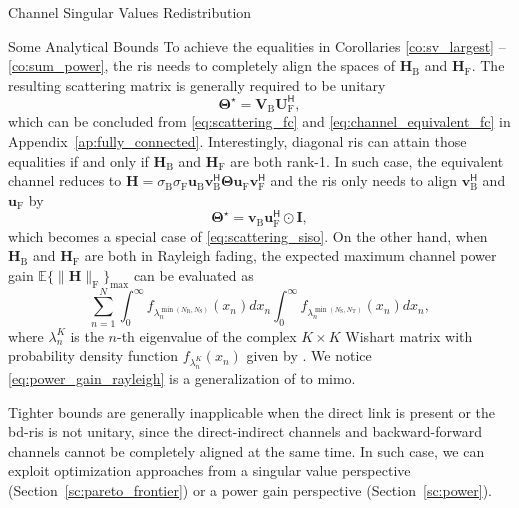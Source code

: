 \documentclass[journal]{IEEEtran}
\begin{document}
\begin{section}{Channel Singular Values Redistribution}
\begin{subsection}{Some Analytical Bounds}
		To achieve the equalities in Corollaries \eqref{co:sv_largest} -- \eqref{co:sum_power}, the \gls{ris} needs to completely align the spaces of $\mathbf{H}_\mathrm{B}$ and $\mathbf{H}_\mathrm{F}$.
		The resulting scattering matrix is generally required to be unitary
		\begin{equation}
			\mathbf{\Theta}^\star = \mathbf{V}_\mathrm{B} \mathbf{U}_\mathrm{F}^\mathsf{H},
			\label{eq:scattering_fc_optimal}
		\end{equation}
		which can be concluded from \eqref{eq:scattering_fc} and \eqref{eq:channel_equivalent_fc} in Appendix~\ref{ap:fully_connected}.
		Interestingly, diagonal \gls{ris} can attain those equalities if and only if $\mathbf{H}_\mathrm{B}$ and $\mathbf{H}_\mathrm{F}$ are both rank-1.
		In such case, the equivalent channel reduces to $\mathbf{H} = \sigma_\mathrm{B} \sigma_\mathrm{F} \mathbf{u}_\mathrm{B} \mathbf{v}_\mathrm{B}^\mathsf{H} \mathbf{\Theta} \mathbf{u}_\mathrm{F} \mathbf{v}_\mathrm{F}^\mathsf{H}$ and the \gls{ris} only needs to align $\mathbf{v}_\mathrm{B}^\mathsf{H}$ and $\mathbf{u}_\mathrm{F}$ by
		\begin{equation}
			\mathbf{\Theta}^\star = \mathbf{v}_\mathrm{B} \mathbf{u}_\mathrm{F}^\mathsf{H} \odot \mathbf{I},
		\end{equation}
		which becomes a special case of \eqref{eq:scattering_siso}.
		On the other hand, when $\mathbf{H}_\mathrm{B}$ and $\mathbf{H}_\mathrm{F}$ are both in Rayleigh fading, the expected maximum channel power gain $\mathbb{E}\bigl\{ \lVert \mathbf{H} \rVert _ \mathrm{F} \bigr\}_{\max}$ can be evaluated as
		\begin{equation}
			\sum_{n=1}^N \int_0^\infty f_{\lambda_n^{\min(N_\mathrm{R},N_\mathrm{S})}}(x_n) d x_n \int_0^\infty f_{\lambda_n^{\min(N_\mathrm{S},N_\mathrm{T})}}(x_n) d x_n,
			\label{eq:power_gain_rayleigh}
		\end{equation}
		where $\lambda_n^{K}$ is the $n$-th eigenvalue of the complex $K \times K$ Wishart matrix with probability density function $f_{\lambda_n^{K}}(x_n)$ given by \cite[Equation 51]{Zanella2009}.
		We notice \eqref{eq:power_gain_rayleigh} is a generalization of \cite[Equation 58]{Shen2020a} to \gls{mimo}.

		Tighter bounds are generally inapplicable when the direct link is present or the \gls{bd}-\gls{ris} is not unitary, since the direct-indirect channels and backward-forward channels cannot be completely aligned at the same time.
		In such case, we can exploit optimization approaches from a singular value perspective (Section~\ref{sc:pareto_frontier}) or a power gain perspective (Section~\ref{sc:power}).
	\end{subsection}
\end{section}
\end{document}
